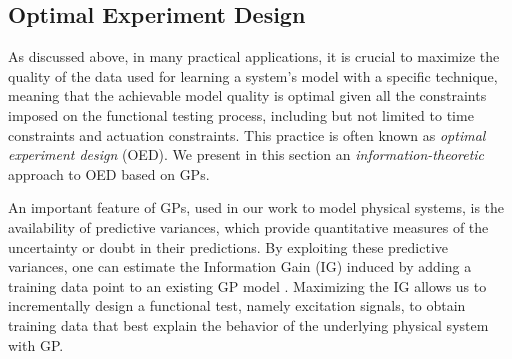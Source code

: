 \subsection{Optimal Experiment Design} %
\label{sec:modeling:oed}

As discussed above, in many practical applications, it is crucial to maximize the quality of the data used for learning a system's model with a specific technique, meaning that the achievable model quality is optimal given all the constraints imposed on the functional testing process, including but not limited to time constraints and actuation constraints.
This practice is often known as \emph{optimal experiment design} (OED).
We present in this section an \emph{information-theoretic} approach to OED based on GPs.

An important feature of GPs, used in our work to model physical systems, is the availability of predictive variances, which provide quantitative measures of the uncertainty or doubt in their predictions.
By exploiting these predictive variances, one can estimate the Information Gain (IG) induced by adding a training data point to an existing GP model \cite{Krause2008} .
Maximizing the IG allows us to incrementally design a functional test, namely excitation signals, to obtain training data that best explain the behavior of the underlying physical system with GP.

